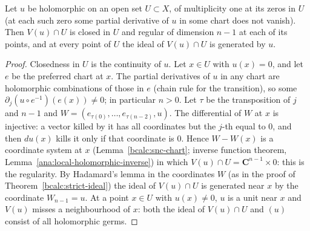 \begin{lemma}
\label{bcalc:hypersurface}
\mixedleanok
Let \(u\) be holomorphic on an open set \(U\subset X\), of multiplicity one at its zeros in \(U\) (at each such zero some partial derivative of
\(u\) in some chart does not vanish). Then \(V(u)\cap U\) is closed in \(U\) and regular of dimension \(n-1\) at each of its points, and at every
point of \(U\) the ideal of \(V(u)\cap U\) is generated by \(u\).
\end{lemma}
\begin{proof}
\mixedleanok
Closedness in \(U\) is the continuity of \(u\). Let \(x\in U\) with \(u(x)=0\), and let \(e\) be the preferred chart at \(x\). The partial derivatives of
\(u\) in any chart are holomorphic combinations of those in \(e\) (chain rule for the transition), so some \(\partial_j(u\circ e^{-1})(e(x))\neq0\);
in particular \(n>0\). Let \(\tau\) be the transposition of \(j\) and \(n-1\) and \(W=(e_{\tau(0)},\dots,e_{\tau(n-2)},u)\). The differential of \(W\) at
\(x\) is injective: a vector killed by it has all coordinates but the \(j\)-th equal to \(0\), and then \(du(x)\) kills it only if that coordinate is
\(0\). Hence \(W-W(x)\) is a coordinate system at \(x\) (Lemma~\ref{bcalc:snc-chart}; inverse function theorem,
Lemma~\ref{ana:local-holomorphic-inverse}) in which \(V(u)\cap U=\mathbf C^{n-1}\times0\): this is the regularity. By Hadamard's lemma in the
coordinates \(W\) (as in the proof of Theorem~\ref{bcalc:strict-ideal}) the ideal of \(V(u)\cap U\) is generated near \(x\) by the coordinate
\(W_{n-1}=u\). At a point \(x\in U\) with \(u(x)\neq0\), \(u\) is a unit near \(x\) and \(V(u)\) misses a neighbourhood of \(x\): both the ideal of
\(V(u)\cap U\) and \((u)\) consist of all holomorphic germs.
\end{proof}

